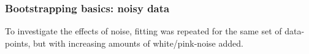 \subsubsection{Bootstrapping basics: noisy data}

To investigate the effects of noise, fitting was repeated for the same set of data-points, but with increasing amounts of white/pink-noise added.

